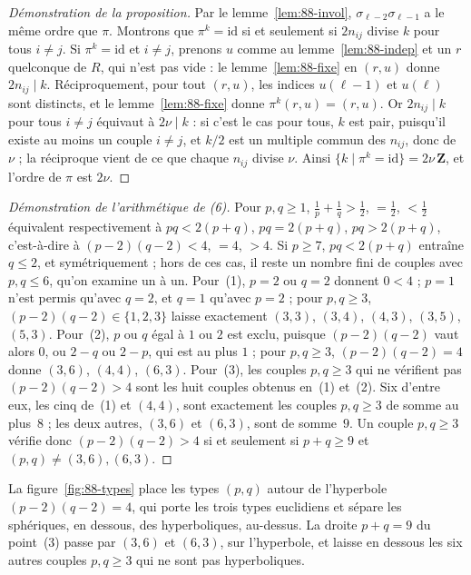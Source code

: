 \begin{proof}[Démonstration de la proposition]
Par le lemme~\ref{lem:88-invol}, $\sigma_{\ell-2}\sigma_{\ell-1}$ a le même ordre que $\pi$. Montrons que $\pi^k = \mathrm{id}$ si et seulement si $2n_{ij}$ divise $k$ pour tous $i \neq j$. Si $\pi^k = \mathrm{id}$ et $i \neq j$, prenons $u$ comme au lemme~\ref{lem:88-indep} et un $r$ quelconque de $R$, qui n'est pas vide : le lemme~\ref{lem:88-fixe} en $(r, u)$ donne $2n_{ij} \mid k$. Réciproquement, pour tout $(r, u)$, les indices $u(\ell - 1)$ et $u(\ell)$ sont distincts, et le lemme~\ref{lem:88-fixe} donne $\pi^k(r, u) = (r, u)$. Or $2n_{ij} \mid k$ pour tous $i \neq j$ équivaut à $2\nu \mid k$ : si c'est le cas pour tous, $k$ est pair, puisqu'il existe au moins un couple $i \neq j$, et $k/2$ est un multiple commun des $n_{ij}$, donc de $\nu$ ; la réciproque vient de ce que chaque $n_{ij}$ divise $\nu$. Ainsi $\{k \mid \pi^k = \mathrm{id}\} = 2\nu\,\mathbf Z$, et l'ordre de $\pi$ est $2\nu$.
\end{proof}

\begin{proof}[Démonstration de l'arithmétique de (6)]
Pour $p, q \geq 1$, $\frac1p + \frac1q > \frac12$, $= \frac12$, $< \frac12$ équivalent respectivement à $pq < 2(p + q)$, $pq = 2(p + q)$, $pq > 2(p + q)$, c'est-à-dire à $(p-2)(q-2) < 4$, $= 4$, $> 4$. Si $p \geq 7$, $pq < 2(p+q)$ entraîne $q \leq 2$, et symétriquement ; hors de ces cas, il reste un nombre fini de couples avec $p, q \leq 6$, qu'on examine un à un. Pour~(1), $p = 2$ ou $q = 2$ donnent $0 < 4$ ; $p = 1$ n'est permis qu'avec $q = 2$, et $q = 1$ qu'avec $p = 2$ ; pour $p, q \geq 3$, $(p-2)(q-2) \in \{1, 2, 3\}$ laisse exactement $(3,3)$, $(3,4)$, $(4,3)$, $(3,5)$, $(5,3)$. Pour~(2), $p$ ou $q$ égal à $1$ ou $2$ est exclu, puisque $(p-2)(q-2)$ vaut alors $0$, ou $2 - q$ ou $2 - p$, qui est au plus $1$ ; pour $p, q \geq 3$, $(p-2)(q-2) = 4$ donne $(3,6)$, $(4,4)$, $(6,3)$. Pour~(3), les couples $p, q \geq 3$ qui ne vérifient pas $(p-2)(q-2) > 4$ sont les huit couples obtenus en~(1) et~(2). Six d'entre eux, les cinq de~(1) et $(4,4)$, sont exactement les couples $p, q \geq 3$ de somme au plus~$8$ ; les deux autres, $(3,6)$ et $(6,3)$, sont de somme~$9$. Un couple $p, q \geq 3$ vérifie donc $(p-2)(q-2) > 4$ si et seulement si $p + q \geq 9$ et $(p, q) \neq (3,6), (6,3)$.
\end{proof}

La figure~\ref{fig:88-types} place les types $(p, q)$ autour de l'hyperbole $(p - 2)(q - 2) = 4$, qui porte les trois types euclidiens et sépare les sphériques, en dessous, des hyperboliques, au-dessus. La droite $p + q = 9$ du point~(3) passe par $(3, 6)$ et $(6, 3)$, sur l'hyperbole, et laisse en dessous les six autres couples $p, q \geq 3$ qui ne sont pas hyperboliques.

